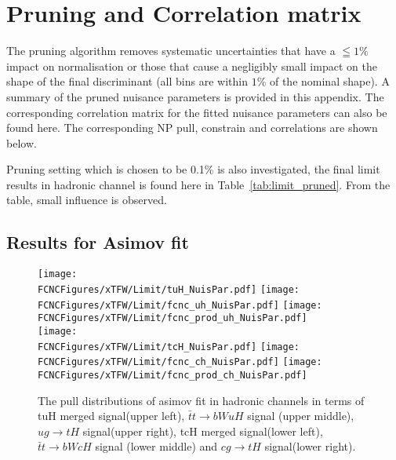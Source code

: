 \section{Pruning and Correlation matrix}
The pruning algorithm removes systematic uncertainties that have a  $\leqq 1\%$ impact on normalisation or those that cause a negligibly small impact on the shape of the final discriminant (all bins are within $1\%$ of the nominal shape). A summary of the pruned nuisance parameters is provided in this appendix.
The corresponding correlation matrix for the fitted nuisance parameters can also be found here. The corresponding NP pull, constrain and correlations are shown below.

Pruning setting  which is chosen to be 0.1\% is also investigated, the final limit results in hadronic channel is found here in Table~\ref{tab:limit_pruned}. From the table, small influence is observed.


\subsection{Results for Asimov fit}

\begin{figure}[H]
\centering

\texttt{[image: \\FCNCFigures/xTFW/Limit/tuH\_NuisPar.pdf]}
\texttt{[image: \\FCNCFigures/xTFW/Limit/fcnc\_uh\_NuisPar.pdf]}
\texttt{[image: \\FCNCFigures/xTFW/Limit/fcnc\_prod\_uh\_NuisPar.pdf]}
\\
\texttt{[image: \\FCNCFigures/xTFW/Limit/tcH\_NuisPar.pdf]}
\texttt{[image: \\FCNCFigures/xTFW/Limit/fcnc\_ch\_NuisPar.pdf]}
\texttt{[image: \\FCNCFigures/xTFW/Limit/fcnc\_prod\_ch\_NuisPar.pdf]}
\caption{The pull distributions of asimov fit in hadronic channels in terms of tuH merged signal(upper left), $\bar{t}t\to bWuH$ signal (upper middle), $ug\to tH$ signal(upper right), tcH merged signal(lower left), $\bar{t}t\to bWcH$ signal (lower middle) and $cg\to tH$ signal(lower right).}
\label{fig:tcH_NuisPar}
\end{figure}

%



